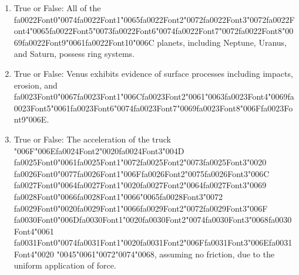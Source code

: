 \documentclass[12pt]{article}
\begin{document}
\begin{enumerate}[label=\arabic*.]
\item True or False: All of the {\csname fa0022Font0\endcsname\char"0074}{\csname fa0022Font1\endcsname\char"0065}{\csname fa0022Font2\endcsname\char"0072}{\csname fa0022Font3\endcsname\char"0072}{\csname fa0022Font4\endcsname\char"0065}{\csname fa0022Font5\endcsname\char"0073}{\csname fa0022Font6\endcsname\char"0074}{\csname fa0022Font7\endcsname\char"0072}{\csname fa0022Font8\endcsname\char"0069}{\csname fa0022Font9\endcsname\char"0061}{\csname fa0022Font10\endcsname\char"006C} planets, including Neptune, Uranus, and Saturn, possess ring systems.
\item True or False: Venus exhibits evidence of surface processes including impacts, erosion, and {\csname fa0023Font0\endcsname\char"0067}{\csname fa0023Font1\endcsname\char"006C}{\csname fa0023Font2\endcsname\char"0061}{\char"0063}{\csname fa0023Font4\endcsname\char"0069}{\csname fa0023Font5\endcsname\char"0061}{\csname fa0023Font6\endcsname\char"0074}{\csname fa0023Font7\endcsname\char"0069}{\csname fa0023Font8\endcsname\char"006F}{\csname fa0023Font9\endcsname\char"006E}.
\item True or False: The acceleration of the truck {\char"006F}{\char"006E}{\csname fa0024Font2\endcsname\char"0020}{\csname fa0024Font3\endcsname\char"004D} {\csname fa0025Font0\endcsname\char"0061}{\csname fa0025Font1\endcsname\char"0072}{\csname fa0025Font2\endcsname\char"0073}{\csname fa0025Font3\endcsname\char"0020} {\csname fa0026Font0\endcsname\char"0077}{\csname fa0026Font1\endcsname\char"006F}{\csname fa0026Font2\endcsname\char"0075}{\csname fa0026Font3\endcsname\char"006C} {\csname fa0027Font0\endcsname\char"0064}{\csname fa0027Font1\endcsname\char"0020}{\csname fa0027Font2\endcsname\char"0064}{\csname fa0027Font3\endcsname\char"0069} {\csname fa0028Font0\endcsname\char"0066}{\csname fa0028Font1\endcsname\char"0066}{\char"0065}{\csname fa0028Font3\endcsname\char"0072} {\csname fa0029Font0\endcsname\char"0020}{\csname fa0029Font1\endcsname\char"0066}{\csname fa0029Font2\endcsname\char"0072}{\csname fa0029Font3\endcsname\char"006F} {\csname fa0030Font0\endcsname\char"006D}{\csname fa0030Font1\endcsname\char"0020}{\csname fa0030Font2\endcsname\char"0074}{\csname fa0030Font3\endcsname\char"0068}{\csname fa0030Font4\endcsname\char"0061} {\csname fa0031Font0\endcsname\char"0074}{\csname fa0031Font1\endcsname\char"0020}{\csname fa0031Font2\endcsname\char"006F}{\csname fa0031Font3\endcsname\char"006E}{\csname fa0031Font4\endcsname\char"0020} {\char"0045}{\char"0061}{\char"0072}{\char"0074}{\char"0068}, assuming no friction, due to the uniform application of force.
\end{enumerate}
\end{document}
